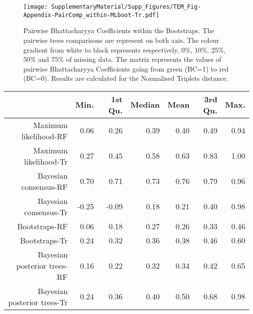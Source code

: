 \begin{figure} 
\centering
    \texttt{[image: SupplementaryMaterial/Supp\_Figures/TEM\_Fig-Appendix-PairComp\_within-MLboot-Tr.pdf]}
\caption{Pairwise Bhattacharyya Coefficients within the Bootstraps. The pairwise trees comparisons are represent on both axis. The colour gradient from white to black represents respectively, 0\%, 10\%, 25\%, 50\% and 75\% of missing data. The matrix represents the values of pairwise Bhattacharyya Coefficients going from green (BC=1) to red (BC=0). Results are calculated for the Normalised Triplets distance.}
\label{Fig_pairComp-MLboot-Tr}
\end{figure} %


\begin{table}[ht]
\centering
\begin{tabular}{rrrrrrr}
  \hline
 & Min. & 1st Qu. & Median & Mean & 3rd Qu. & Max. \\ 
  \hline
  Maximum likelihood-RF & 0.06 & 0.26 & 0.39 & 0.40 & 0.49 & 0.94 \\ 
  Maximum likelihood-Tr & 0.27 & 0.45 & 0.58 & 0.63 & 0.83 & 1.00 \\ 
  Bayesian consensus-RF & 0.70 & 0.71 & 0.73 & 0.76 & 0.79 & 0.96 \\ 
  Bayesian consensus-Tr & -0.25 & -0.09 & 0.18 & 0.21 & 0.40 & 0.98 \\ 
  Bootstraps-RF & 0.06 & 0.18 & 0.27 & 0.26 & 0.33 & 0.46 \\ 
  Bootstraps-Tr & 0.24 & 0.32 & 0.36 & 0.38 & 0.46 & 0.60 \\ 
  Bayesian posterior trees-RF & 0.16 & 0.22 & 0.32 & 0.34 & 0.42 & 0.65 \\ 
  Bayesian posterior trees-Tr & 0.24 & 0.36 & 0.40 & 0.50 & 0.68 & 0.98 \\ 
   \hline
\end{tabular}
\end{table}